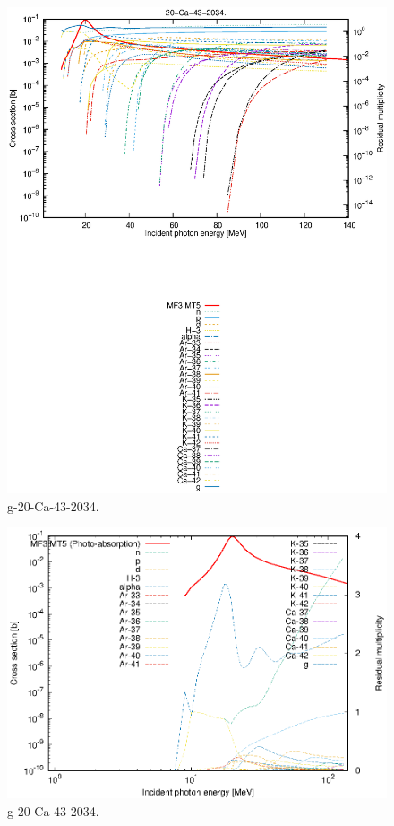 \begin{figure}
 \includegraphics[width=\linewidth]{eps/g_20-Ca-43_2034.eps}
  \caption{g-20-Ca-43-2034.}
\end{figure}
\newpage \clearpage

\begin{figure}
 \includegraphics[width=\linewidth]{eps-log/g_20-Ca-43_2034.eps}
 \caption{g-20-Ca-43-2034.}
\end{figure}
\newpage \clearpage

